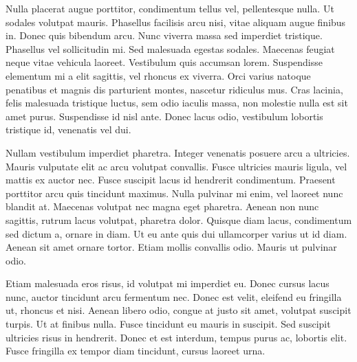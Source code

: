 Nulla placerat augue porttitor, condimentum tellus vel, pellentesque nulla. Ut sodales volutpat mauris. Phasellus facilisis arcu nisi, vitae aliquam augue finibus in. Donec quis bibendum arcu. Nunc viverra massa sed imperdiet tristique. Phasellus vel sollicitudin mi. Sed malesuada egestas sodales. Maecenas feugiat neque vitae vehicula laoreet. Vestibulum quis accumsan lorem. Suspendisse elementum mi a elit sagittis, vel rhoncus ex viverra. Orci varius natoque penatibus et magnis dis parturient montes, nascetur ridiculus mus. Cras lacinia, felis malesuada tristique luctus, sem odio iaculis massa, non molestie nulla est sit amet purus. Suspendisse id nisl ante. Donec lacus odio, vestibulum lobortis tristique id, venenatis vel dui.

Nullam vestibulum imperdiet pharetra. Integer venenatis posuere arcu a ultricies. Mauris vulputate elit ac arcu volutpat convallis. Fusce ultricies mauris ligula, vel mattis ex auctor nec. Fusce suscipit lacus id hendrerit condimentum. Praesent porttitor arcu quis tincidunt maximus. Nulla pulvinar mi enim, vel laoreet nunc blandit at. Maecenas volutpat nec magna eget pharetra. Aenean non nunc sagittis, rutrum lacus volutpat, pharetra dolor. Quisque diam lacus, condimentum sed dictum a, ornare in diam. Ut eu ante quis dui ullamcorper varius ut id diam. Aenean sit amet ornare tortor. Etiam mollis convallis odio. Mauris ut pulvinar odio.

Etiam malesuada eros risus, id volutpat mi imperdiet eu. Donec cursus lacus nunc, auctor tincidunt arcu fermentum nec. Donec est velit, eleifend eu fringilla ut, rhoncus et nisi. Aenean libero odio, congue at justo sit amet, volutpat suscipit turpis. Ut at finibus nulla. Fusce tincidunt eu mauris in suscipit. Sed suscipit ultricies risus in hendrerit. Donec et est interdum, tempus purus ac, lobortis elit. Fusce fringilla ex tempor diam tincidunt, cursus laoreet urna.

